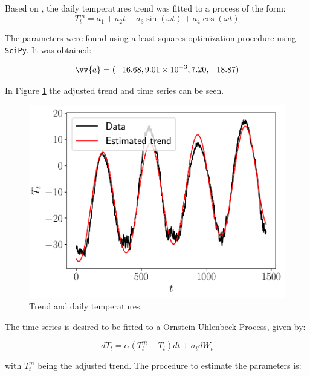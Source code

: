 \documentclass[11pt]{article}
\theoremstyle{definition}
\theoremstyle{remark}
\theoremstyle{remark}
\begin{document}
Based on \parencite{alaton2002}, the daily temperatures trend was
fitted to a process of the form:
\begin{equation*}
  T^m_t = a_1 + a_2t + a_3\sin(\omega t) + a_4\cos(\omega t)
\end{equation*}

The parameters were found using a least-squares optimization
procedure using \texttt{SciPy}. It was obtained:

\begin{equation*}
  \vv{a} = (-16.68, 9.01 \times 10^{-3}, 7.20, -18.87)
\end{equation*}

In Figure \ref{fig:trend} the adjusted trend and time series can be
seen.

\begin{figure}[H]
  \centering
  \includegraphics[scale=.5]{sine_trend.pdf}
  \caption{Trend and daily temperatures.}
  \label{fig:trend}
\end{figure}

The time series is desired to be fitted to a Ornstein-Uhlenbeck
Process, given by:

\begin{equation*}
  dT_t = \alpha(T_t^m - T_t)dt + \sigma_t dW_t
\end{equation*}

with $T_t^m$ being the adjusted trend. The procedure to estimate the
parameters is:
\end{document}

